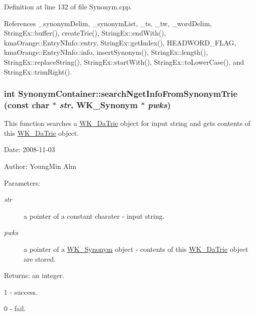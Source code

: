 Definition at line 132 of file Synonym.cpp.

References \_\-synonymDelim, \_\-synonymList, \_\-ts, \_\-tw, \_\-wordDelim, StringEx::buffer(), createTrie(), StringEx::endWith(), kmaOrange::EntryNInfo::entry, StringEx::getIndex(), HEADWORD\_\-FLAG, kmaOrange::EntryNInfo::info, insertSynonym(), StringEx::length(), StringEx::replaceString(), StringEx::startWith(), StringEx::toLowerCase(), and StringEx::trimRight().\hypertarget{classkmaOrange_1_1SynonymContainer_d17697e0744a34ea4d9ffe782e981cc4}{
\subsubsection[{searchNgetInfoFromSynonymTrie}]{\setlength{\rightskip}{0pt plus 5cm}int SynonymContainer::searchNgetInfoFromSynonymTrie (const char $\ast$ {\em str}, \/  {\bf WK\_\-Synonym} $\ast$ {\em pwks})}}
\label{classkmaOrange_1_1SynonymContainer_d17697e0744a34ea4d9ffe782e981cc4}


This function searches a \hyperlink{classkmaOrange_1_1WK__DaTrie}{WK\_\-DaTrie} object for input string and gets contents of this \hyperlink{classkmaOrange_1_1WK__DaTrie}{WK\_\-DaTrie} object. 

\begin{Desc}
\item[Date:]2008-11-03 \end{Desc}
\begin{Desc}
\item[Author:]YoungMin Ahn \end{Desc}
\begin{Desc}
\item[Parameters:]
\begin{description}
\item[{\em str}]a pointer of a constant charater - input string. \item[{\em pwks}]a pointer of a \hyperlink{classWK__Synonym}{WK\_\-Synonym} object - contents of this \hyperlink{classkmaOrange_1_1WK__DaTrie}{WK\_\-DaTrie} object are stored. \end{description}
\end{Desc}
\begin{Desc}
\item[Returns:]an integer.\par
 1 - success.\par
 0 - fail. \end{Desc}


